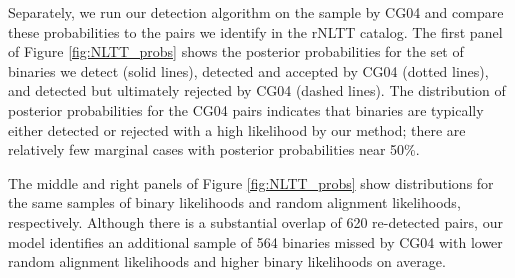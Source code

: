 \documentclass[usenatbib]{mnras}
\begin{document}




Separately, we run our detection algorithm on the sample by CG04 and compare these probabilities to the pairs we identify in the rNLTT catalog. The first panel of Figure \ref{fig:NLTT_probs} shows the posterior probabilities for the set of binaries we detect (solid lines), detected and accepted by CG04 (dotted lines), and detected but ultimately rejected by CG04 (dashed lines). The distribution of posterior probabilities for the CG04 pairs indicates that binaries are typically either detected or rejected with a high likelihood by our method; there are relatively few marginal cases with posterior probabilities near 50\%.


The middle and right panels of Figure \ref{fig:NLTT_probs} show distributions for the same samples of binary likelihoods and random alignment likelihoods, respectively. Although there is a substantial overlap of 620 re-detected pairs, our model identifies an additional sample of 564 binaries missed by CG04 with lower random alignment likelihoods and higher binary likelihoods on average. 
\end{document}
